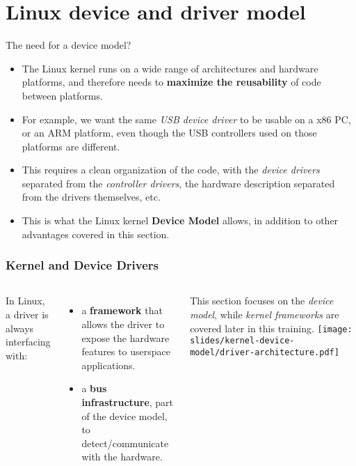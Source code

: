 \section{Linux device and driver model}

\begin{frame}{The need for a device model?}
  \begin{itemize}
  \item The Linux kernel runs on a wide range of architectures and
    hardware platforms, and therefore needs to {\bf maximize the
      reusability} of code between platforms.
  \item For example, we want the same {\em USB device driver} to be
    usable on a x86 PC, or an ARM platform, even though the USB
    controllers used on those platforms are different.
  \item This requires a clean organization of the code, with the {\em
      device drivers} separated from the {\em controller drivers}, the
    hardware description separated from the drivers themselves, etc.
  \item This is what the Linux kernel {\bf Device Model} allows, in
    addition to other advantages covered in this section.
  \end{itemize}
\end{frame}

\begin{frame}
  \frametitle{Kernel and Device Drivers}
  \begin{columns}
     In Linux, a driver is always interfacing with:
    \begin{itemize}
    \item a {\bf framework} that allows the driver to expose the hardware features to userspace applications.
    \item a {\bf bus infrastructure}, part of the device model, to detect/communicate with the hardware.
    \end{itemize}
    This section focuses on the {\em device model}, while {\em kernel
      frameworks} are covered later in this training.
    \texttt{[image: slides/kernel-device-model/driver-architecture.pdf]}
  \end{columns}
\end{frame}


